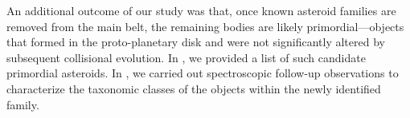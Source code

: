         An additional outcome of our study was that, once known asteroid families are removed from the main belt, the remaining bodies are likely primordial—objects that formed in the proto-planetary disk and were not significantly altered by subsequent collisional evolution. In \citet{2023A&A...676A...5F}, we provided a list of such candidate primordial asteroids. In \citet{2024A&A...682A..64B}, we carried out spectroscopic follow-up observations to characterize the taxonomic classes of the objects within the newly identified family.
